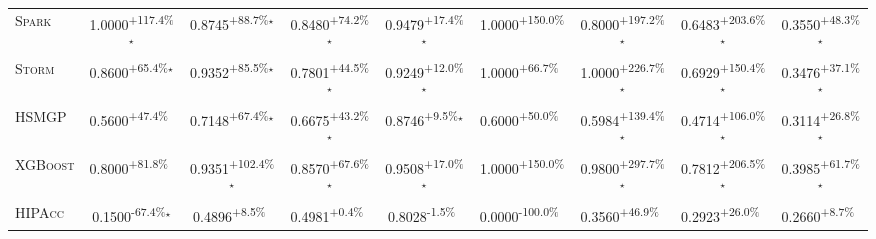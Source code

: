 \begin{table}[htbp]
\begin{tabular}{l|cccc|cccc}
\textsc{Spark} & \cellcolor{green!30}1.0000\textsuperscript{+117.4\%}$^\star$ & \cellcolor{green!30}0.8745\textsuperscript{+88.7\%}$^\star$ & \cellcolor{green!30}0.8480\textsuperscript{+74.2\%}$^\star$ & \cellcolor{green!30}0.9479\textsuperscript{+17.4\%}$^\star$ & \cellcolor{green!30}1.0000\textsuperscript{+150.0\%}$^{\,\,\,}$ & \cellcolor{green!30}0.8000\textsuperscript{+197.2\%}$^\star$ & \cellcolor{green!30}0.6483\textsuperscript{+203.6\%}$^\star$ & \cellcolor{green!30}0.3550\textsuperscript{+48.3\%}$^\star$ \\
\textsc{Storm} & \cellcolor{green!30}0.8600\textsuperscript{+65.4\%}$^\star$ & \cellcolor{green!30}0.9352\textsuperscript{+85.5\%}$^\star$ & \cellcolor{green!30}0.7801\textsuperscript{+44.5\%}$^\star$ & \cellcolor{green!30}0.9249\textsuperscript{+12.0\%}$^\star$ & \cellcolor{green!30}1.0000\textsuperscript{+66.7\%}$^{\,\,\,}$ & \cellcolor{green!30}1.0000\textsuperscript{+226.7\%}$^\star$ & \cellcolor{green!30}0.6929\textsuperscript{+150.4\%}$^\star$ & \cellcolor{green!30}0.3476\textsuperscript{+37.1\%}$^\star$ \\
\textsc{HSMGP} & \cellcolor{green!30}0.5600\textsuperscript{+47.4\%}$^{\,\,\,}$ & \cellcolor{green!30}0.7148\textsuperscript{+67.4\%}$^\star$ & \cellcolor{green!30}0.6675\textsuperscript{+43.2\%}$^\star$ & \cellcolor{green!30}0.8746\textsuperscript{+9.5\%}$^\star$ & \cellcolor{green!30}0.6000\textsuperscript{+50.0\%}$^{\,\,\,}$ & \cellcolor{green!30}0.5984\textsuperscript{+139.4\%}$^\star$ & \cellcolor{green!30}0.4714\textsuperscript{+106.0\%}$^\star$ & \cellcolor{green!30}0.3114\textsuperscript{+26.8\%}$^\star$ \\
\textsc{XGBoost} & \cellcolor{green!30}0.8000\textsuperscript{+81.8\%}$^{\,\,\,}$ & \cellcolor{green!30}0.9351\textsuperscript{+102.4\%}$^\star$ & \cellcolor{green!30}0.8570\textsuperscript{+67.6\%}$^\star$ & \cellcolor{green!30}0.9508\textsuperscript{+17.0\%}$^\star$ & \cellcolor{green!30}1.0000\textsuperscript{+150.0\%}$^{\,\,\,}$ & \cellcolor{green!30}0.9800\textsuperscript{+297.7\%}$^\star$ & \cellcolor{green!30}0.7812\textsuperscript{+206.5\%}$^\star$ & \cellcolor{green!30}0.3985\textsuperscript{+61.7\%}$^\star$ \\
\textsc{HIPAcc} & \cellcolor{red!30}0.1500\textsuperscript{-67.4\%}$^\star$ & \cellcolor{green!30}0.4896\textsuperscript{+8.5\%}$^{\,\,\,}$ & \cellcolor{green!30}0.4981\textsuperscript{+0.4\%}$^{\,\,\,}$ & \cellcolor{red!30}0.8028\textsuperscript{-1.5\%}$^{\,\,\,}$ & \cellcolor{red!30}0.0000\textsuperscript{-100.0\%}$^{\,\,\,}$ & \cellcolor{green!30}0.3560\textsuperscript{+46.9\%}$^{\,\,\,}$ & \cellcolor{green!30}0.2923\textsuperscript{+26.0\%}$^{\,\,\,}$ & \cellcolor{green!30}0.2660\textsuperscript{+8.7\%}$^{\,\,\,}$ \\

\end{tabular}
\end{table}
